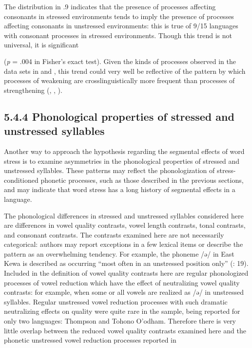   The distribution in .9 indicates that the presence of processes affecting consonants in stressed environments tends to imply the presence of processes affecting consonants in unstressed environments: this is true of 9/15 languages with consonant processes in stressed environments. Though this trend is not universal, it is significant 

(\textit{p} = .004 in Fisher’s exact test). Given the kinds of processes observed in the data sets in  and , this trend could very well be reflective of the pattern by which processes of weakening are crosslinguistically more frequent than processes of strengthening (\citealt{BybeeEasterday2019}, \citealt{Bybee2015b}, \citealt{Lavoie2015}).

\subsection{5.4.4 Phonological properties of stressed and unstressed syllables}

  Another way to approach the hypothesis regarding the segmental effects of word stress is to examine asymmetries in the phonological properties of stressed and unstressed syllables. These patterns may reflect the phonologization of stress-conditioned phonetic processes, such as those described in the previous sections, and may indicate that word stress has a long history of segmental effects in a language.

  The phonological differences in stressed and unstressed syllables considered here are differences in vowel quality contrasts, vowel length contrasts, tonal contrasts, and consonant contrasts. The contrasts examined here are not necessarily categorical: authors may report exceptions in a few lexical items or describe the pattern as an overwhelming tendency. For example, the phoneme /ə/ in East Kewa is described as occurring “most often in an unstressed position only” (\citealt{FranklinFranklin1978}: 19). Included in the definition of vowel quality contrasts here are regular phonologized processes of vowel reduction which have the effect of neutralizing vowel quality contrasts: for example, when some or all vowels are realized as /ə/ in unstressed syllables. Regular unstressed vowel reduction processes with such dramatic neutralizing effects on quality were quite rare in the sample, being reported for only two languages: Thompson and Tohono O’odham. Therefore there is very little overlap between the reduced vowel quality contrasts examined here and the phonetic unstressed vowel reduction processes reported in 

